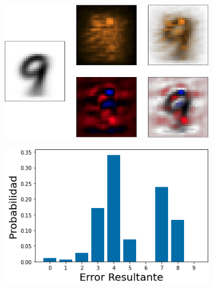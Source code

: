 \begin{figure}[h!]
    \centering
    \begin{subfigure}[b]{0.47\textwidth}
        \centering
        \includegraphics[width=\textwidth]{images/saliency/mnist/linear/9_saliency_figures.png}
        \caption{}
        \label{9_saliency}
    \end{subfigure}
    \hfill
    \begin{subfigure}[b]{0.47\textwidth}
        \centering
        \includegraphics[width=\textwidth]{images/saliency/mnist/linear/9_error.png}
        \caption{}
        \label{9_error}
    \end{subfigure}
    \caption{}
    \label{9_SAL}
\end{figure}

